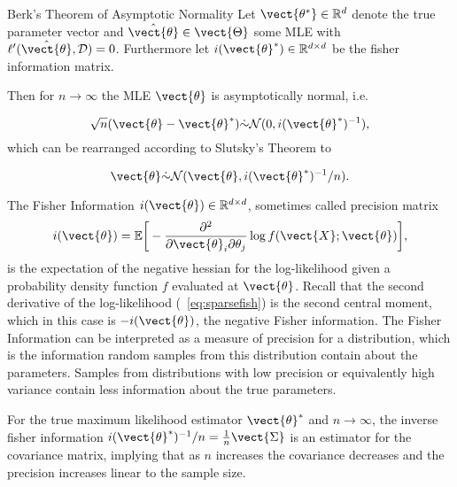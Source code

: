         \begin{threm}{Berk's Theorem of Asymptotic Normality\cite{berk1972consistency}}
            \label{theorem:berk}
            Let $\vect{\theta^*} \in \mathbb{R}^d$ denote the true parameter vector and $\hat{\vect{\theta}} \in \vect{\Theta}$ some MLE with $\ell'(\hat{\vect{\theta}}, \mathcal{D}) = 0$.
            Furthermore let $i(\vect{\theta}^*) \in \mathbb{R}^{d \times d}$ be the fisher information matrix.

            Then for $n \rightarrow \infty$ the MLE $\vect{\theta}$ is asymptotically normal, i.e.

            \begin{equation}
                \sqrt{n}(\vect{\theta} - \vect{\theta}^*) \dot{\sim} \mathcal{N}(0, i(\vect{\theta}^*)^{-1}),
            \end{equation}
            which can be rearranged according to Slutsky's Theorem\cite{casella2002statistical} to

            \begin{equation}
                \vect{\theta} \dot{\sim} \mathcal{N}(\vect{\theta}, i(\vect{\theta}^*)^{-1}/n).
            \end{equation}
        \end{threm}

        The Fisher Information $i(\vect{\theta}) \in \mathbb{R}^{d \times d}$, sometimes called precision matrix
        \begin{equation*}
            i(\vect{\theta}) = \mathbb{E}\bigg[- \frac{\partial^2}{\partial \vect{\theta}_i \partial \theta_j} \log f(\vect{X}; \vect{\theta})\bigg] ,
        \end{equation*} 
        is the expectation of the negative hessian for the log-likelihood given a probability density function $f$ evaluated at $\vect{\theta}$.
        Recall that the second derivative of the log-likelihood (\eq~\ref{eq:sparsefish}) is the second central moment, which in this case is $-i(\vect{\theta})$, the negative Fisher information.
        The Fisher Information can be interpreted as a measure of precision for a distribution, which is the information random samples from this distribution contain about the parameters.
        Samples from distributions with low precision or equivalently high variance contain less information about the true parameters.

        For the true maximum likelihood estimator $\vect{\theta}^*$  and $n \rightarrow \infty$, the inverse fisher information $i(\vect{\theta}^*)^{-1}/ n = \frac{1}{n} \vect{\Sigma}$ is an estimator for the covariance matrix, implying that as $n$ increases the covariance decreases and the precision increases linear to the sample size.

